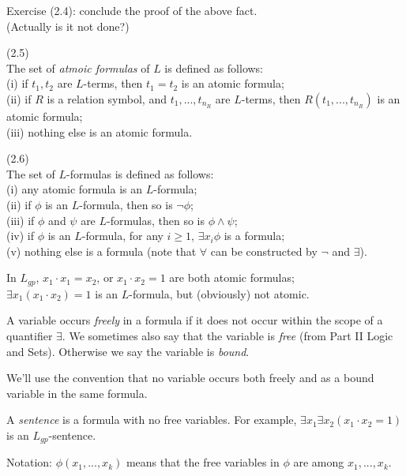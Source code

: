 \documentclass[a4paper]{article}
\begin{document}
Exercise (2.4): conclude the proof of the above fact.\\
(Actually is it not done?)

\begin{defi} (2.5)\\
    The set of \emph{atmoic formulas} of $L$ is defined as follows:\\
    (i) if $t_1,t_2$ are $L$-terms, then $t_1 = t_2$ is an atomic formula;\\
    (ii) if $R$ is a relation symbol, and $t_1,...,t_{n_R}$ are $L$-terms, then $R(t_1,...,t_{n_R})$ is an atomic formula;\\
    (iii) nothing else is an atomic formula.
\end{defi}

\begin{defi} (2.6)\\
    The set of $L$-formulas is defined as follows:\\
    (i) any atomic formula is an $L$-formula;\\
    (ii) if $\phi$ is an $L$-formula, then so is $\neg \phi$;\\
    (iii) if $\phi$ and $\psi$ are $L$-formulas, then so is $\phi \wedge \psi$;\\
    (iv) if $\phi$ is an $L$-formula, for any $i \geq 1$, $\exists x_i \phi$ is a formula;\\
    (v) nothing else is a formula (note that $\forall$ can be constructed by $\neg$ and $\exists$).
\end{defi}

\begin{eg}
    In $L_{gp}$, $x_1\cdot x_1 = x_2$, or $x_1\cdot x_2=1$ are both atomic formulas;\\
    $\exists x_1(x_1 \cdot x_2) = 1$ is an $L$-formula, but (obviously) not atomic.
\end{eg}

A variable occurs \emph{freely} in a formula if it does not occur within the scope of a quantifier $\exists$. We sometimes also say that the variable is \emph{free} (from Part II Logic and Sets). Otherwise we say the variable is \emph{bound}.

We'll use the convention that no variable occurs both freely and as a bound variable in the same formula.

A \emph{sentence} is a formula with no free variables. For example, $\exists x_1\exists x_2 (x_1\cdot x_2=1)$ is an $L_{gp}$-sentence.

Notation: $\phi(x_1,...,x_k)$ means that the free variables in $\phi$ are among $x_1,...,x_k$.
\end{document}
